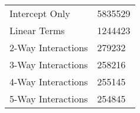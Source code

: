 \begin{table}[ht]
\centering
\begin{tabular}{ll}
  \hline
  \hline
Intercept Only & 5835529 \\ 
  Linear Terms & 1244423 \\ 
  2-Way Interactions & 279232 \\ 
  3-Way Interactions & 258216 \\ 
  4-Way Interactions & 255145 \\ 
  5-Way Interactions & 254845 \\ 
   \hline
\end{tabular}
\end{table}
